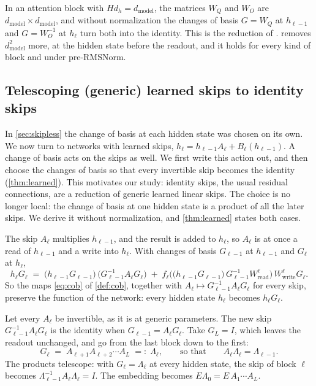 \documentclass[10pt]{article}
\theoremstyle{definition}
\theoremstyle{remark}
\newcommand{\Wread}{W_{\mathrm{read}}}
\newcommand{\Wwrite}{W_{\mathrm{write}}}
\newcommand{\dm}{d_{\mathrm{model}}}
\begin{document}
In an attention block with $Hd_h = \dm$, the matrices $W_Q$ and $W_O$ are $\dm\times\dm$, and without normalization the changes of basis $G = W_Q$ at $h_{\ell-1}$ and $G = W_O^{-1}$ at $h_\ell$ turn both into the identity. This is the reduction of \citet{graef2024tricks}.  removes $\dm^2$ more, at the hidden state before the readout, and it holds for every kind of block and under pre-RMSNorm.

\subsection{Telescoping (generic) learned skips to identity skips}\label{sec:learned}

In \cref{sec:skipless} the change of basis at each hidden state was chosen on its own. We now turn to networks with learned skips, $h_\ell = h_{\ell-1}A_\ell + B_\ell(h_{\ell-1})$. A change of basis acts on the skips as well. We first write this action out, and then choose the changes of basis so that every invertible skip becomes the identity (\cref{thm:learned}). This motivates our study: identity skips, the usual residual connections, are a reduction of generic learned linear skips. The choice is no longer local: the change of basis at one hidden state is a product of all the later skips. We derive it without normalization, and \cref{thm:learned} states both cases.

The skip $A_\ell$ multiplies $h_{\ell-1}$, and the result is added to $h_\ell$, so $A_\ell$ is at once a read of $h_{\ell-1}$ and a write into $h_\ell$. With changes of basis $G_{\ell-1}$ at $h_{\ell-1}$ and $G_\ell$ at $h_\ell$,
\begin{equation}\label{eq:skipmap}
h_\ell G_\ell \;=\; \big(h_{\ell-1}G_{\ell-1}\big)\,\big(G_{\ell-1}^{-1}A_\ell G_\ell\big) \;+\; f_\ell\Big(\big(h_{\ell-1}G_{\ell-1}\big)\,G_{\ell-1}^{-1}\Wread^{\ell}\Big)\,\Wwrite^{\ell}G_\ell .
\end{equation}
So the maps \eqref{eq:cob} of \cref{def:cob}, together with $A_\ell \mapsto G_{\ell-1}^{-1}A_\ell G_\ell$ for every skip, preserve the function of the network: every hidden state $h_\ell$ becomes $h_\ell G_\ell$.

Let every $A_\ell$ be invertible, as it is at generic parameters. The new skip $G_{\ell-1}^{-1}A_\ell G_\ell$ is the identity when $G_{\ell-1} = A_\ell G_\ell$. Take $G_L = I$, which leaves the readout unchanged, and go from the last block down to the first:
\begin{equation}\label{eq:sweep}
G_\ell \;=\; A_{\ell+1}A_{\ell+2}\cdots A_L \;=:\; \Lambda_\ell, \qquad\text{so that}\qquad A_\ell\Lambda_\ell = \Lambda_{\ell-1}.
\end{equation}
The products telescope: with $G_\ell = \Lambda_\ell$ at every hidden state, the skip of block $\ell$ becomes $\Lambda_{\ell-1}^{-1}A_\ell\Lambda_\ell = I$. The embedding becomes $E\Lambda_0 = E\,A_1\cdots A_L$.
\end{document}
